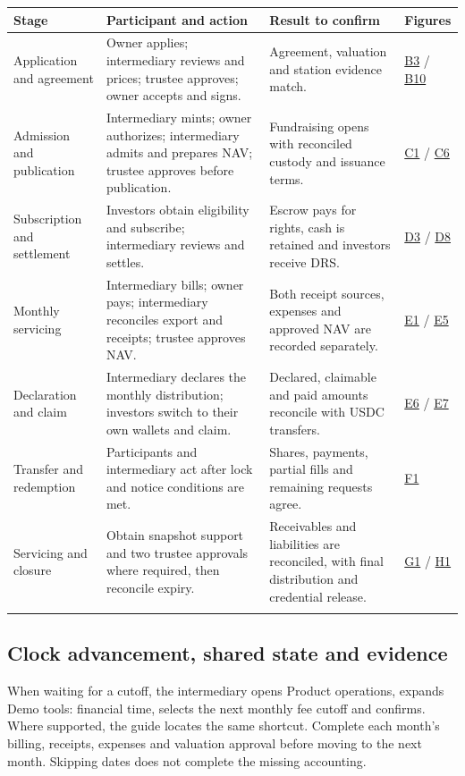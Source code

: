 \documentclass[12pt,a4paper]{article}
\begin{document}
\begin{longtable}{L{2.8cm}L{4.6cm}L{5.1cm}L{1.7cm}}\toprule Stage & Participant and action & Result to confirm & Figures\\\midrule\endhead
Application and agreement & Owner applies; intermediary reviews and prices; trustee approves; owner accepts and signs. & Agreement, valuation and station evidence match. & \hyperref[step:B3]{B3} / \hyperref[step:B10]{B10}\\\addlinespace
Admission and publication & Intermediary mints; owner authorizes; intermediary admits and prepares NAV; trustee approves before publication. & Fundraising opens with reconciled custody and issuance terms. & \hyperref[step:C1]{C1} / \hyperref[step:C6]{C6}\\\addlinespace
Subscription and settlement & Investors obtain eligibility and subscribe; intermediary reviews and settles. & Escrow pays for rights, cash is retained and investors receive DRS. & \hyperref[step:D3]{D3} / \hyperref[step:D8]{D8}\\\addlinespace
Monthly servicing & Intermediary bills; owner pays; intermediary reconciles export and receipts; trustee approves NAV. & Both receipt sources, expenses and approved NAV are recorded separately. & \hyperref[step:E1]{E1} / \hyperref[step:E5]{E5}\\\addlinespace
Declaration and claim & Intermediary declares the monthly distribution; investors switch to their own wallets and claim. & Declared, claimable and paid amounts reconcile with USDC transfers. & \hyperref[step:E6]{E6} / \hyperref[step:E7]{E7}\\\addlinespace
Transfer and redemption & Participants and intermediary act after lock and notice conditions are met. & Shares, payments, partial fills and remaining requests agree. & \hyperref[step:F1]{F1}\\\addlinespace
Servicing and closure & Obtain snapshot support and two trustee approvals where required, then reconcile expiry. & Receivables and liabilities are reconciled, with final distribution and credential release. & \hyperref[step:G1]{G1} / \hyperref[step:H1]{H1}\\\addlinespace
\bottomrule\end{longtable}
\subsection{Clock advancement, shared state and evidence}
When waiting for a cutoff, the intermediary opens Product operations, expands Demo tools: financial time, selects the next monthly fee cutoff and confirms. Where supported, the guide locates the same shortcut. Complete each month's billing, receipts, expenses and valuation approval before moving to the next month. Skipping dates does not complete the missing accounting.
\end{document}
